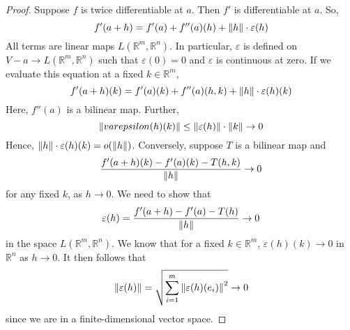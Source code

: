 \begin{proof}
	Suppose \( f \) is twice differentiable at \( a \).
	Then \( f' \) is differentiable at \( a \).
	So,
	\[
		f'(a+h) = f'(a) + f''(a)(h) + \norm{h} \cdot \varepsilon(h)
	\]
	All terms are linear maps \( L(\mathbb R^m, \mathbb R^n) \).
	In particular, \( \varepsilon \) is defined on \( V - a \to L(\mathbb R^m, \mathbb R^n) \) such that \( \varepsilon(0) = 0 \) and \( \varepsilon \) is continuous at zero.
	If we evaluate this equation at a fixed \( k \in \mathbb R^m \),
	\[
		f'(a+h)(k) = f'(a)(k) + f''(a)(h,k) + \norm{h} \cdot \varepsilon(h)(k)
	\]
	Here, \( f''(a) \) is a bilinear map.
	Further,
	\[
		\norm{varepsilon(h)(k)} \leq \norm{\varepsilon(h)} \cdot \norm{k} \to 0
	\]
	Hence, \( \norm{h} \cdot \varepsilon(h)(k) = o\qty(\norm{h}) \).
	Conversely, suppose \( T \) is a bilinear map and
	\[
		\frac{f'(a+h)(k) - f'(a)(k) - T(h,k)}{\norm{h}} \to 0
	\]
	for any fixed \( k \), as \( h \to 0 \).
	We need to show that
	\[
		\varepsilon(h) = \frac{f'(a+h) - f'(a) - T(h)}{\norm{h}} \to 0
	\]
	in the space \( L(\mathbb R^m, \mathbb R^n) \).
	We know that for a fixed \( k \in \mathbb R^m \), \( \varepsilon(h)(k) \to 0 \) in \( \mathbb R^n \) as \( h \to 0 \).
	It then follows that
	\[
		\norm{\varepsilon(h)} = \sqrt{\sum_{i=1}^m \norm{\varepsilon(h)(e_i)}^2} \to 0
	\]
	since we are in a finite-dimensional vector space.
\end{proof}
